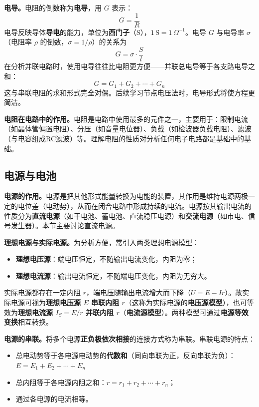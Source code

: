 \documentclass[12pt,UTF8]{ctexbook}
\begin{document}
\textbf{电导。}电阻的倒数称为\textbf{电导}，用 $G$ 表示：
\[
G = \frac{1}{R}
\]
电导反映导体\textbf{导电}的能力，单位为\textbf{西门子}（S），$1\,\mathrm{S} = 1\,\Omega^{-1}$。电导 $G$ 与电导率 $\sigma$（电阻率 $\rho$ 的倒数，$\sigma = 1/\rho$）的关系为
\[
G = \sigma \cdot \frac{S}{l}
\]
在分析并联电路时，使用电导往往比电阻更方便——并联总电导等于各支路电导之和：
\[
G = G_1 + G_2 + \cdots + G_n
\]
这与串联电阻的求和形式完全对偶。后续学习节点电压法时，电导形式将使方程更简洁。

\textbf{电阻在电路中的作用。}电阻是电路中使用最多的元件之一，主要用于：限制电流（如晶体管偏置电阻）、分压（如音量电位器）、负载（如检波器负载电阻）、滤波（与电容组成RC滤波）等。理解电阻的性质对分析任何电子电路都是基础中的基础。

\subsection{电源与电池}

\textbf{电源的作用。}电源是把其他形式能量转换为电能的装置，其作用是维持电源两极一定的电位差（电动势），从而在闭合电路中形成持续的电流。电源按其输出电流的性质分为\textbf{直流电源}（如干电池、蓄电池、直流稳压电源）和\textbf{交流电源}（如市电、信号发生器）。本节主要讨论直流电源。

\textbf{理想电源与实际电源。}为分析方便，常引入两类理想电源模型：
\begin{itemize}
  \item \textbf{理想电压源}：端电压恒定，不随输出电流变化，内阻为零；
  \item \textbf{理想电流源}：输出电流恒定，不随端电压变化，内阻为无穷大。
\end{itemize}
实际电源都存在一定内阻 $r$，端电压随输出电流增大而下降（$U = E - Ir$）。故实际电源可视为\textbf{理想电压源 $E$ 串联内阻 $r$}（这称为实际电源的\textbf{电压源模型}），也可等效为\textbf{理想电流源 $I_S = E/r$ 并联内阻 $r$}（\textbf{电流源模型}）。两种模型可通过\textbf{电源等效变换}相互转换。

\textbf{电源的串联。}将多个电源\textbf{正负极依次相接}的连接方式称为串联。串联电源的特点：

\begin{itemize}
\item 总电动势等于各电源电动势的\textbf{代数和}（同向串联为正，反向串联为负）：$E = E_1 + E_2 + \cdots + E_n$
\item 总内阻等于各电源内阻之和：$r = r_1 + r_2 + \cdots + r_n$；
\item 通过各电源的电流相等。
\end{itemize}
\end{document}
